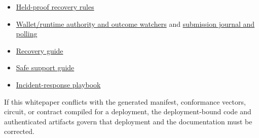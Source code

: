 \documentclass[11pt,letterpaper]{article}
\begin{document}
\begin{itemize}
{  review}, and
  \href{https://github.com/stellarchain/io.stellarkey/blob/v1.1.2/src/features/private-balance/runtime/fee-policy.ts}{fee
  policy}
\item
  \href{https://github.com/stellarchain/io.stellarkey/blob/v1.1.2/src/features/private-balance/runtime/spend-recovery.ts}{Held-proof
  recovery rules}
\item
  \href{https://github.com/stellarchain/io.stellarkey/blob/v1.1.2/src/features/private-balance/runtime/provider.tsx}{Wallet/\allowbreak{}runtime
  authority and outcome watchers} and
  \href{https://github.com/stellarchain/io.stellarkey/blob/v1.1.2/src/features/private-balance/runtime/submission.ts}{submission
  journal and polling}
\item
  \href{https://github.com/stellarchain/io.stellarkey/blob/v1.1.2/docs/private-balance-recovery.md}{Recovery
  guide}
\item
  \href{https://github.com/stellarchain/io.stellarkey/blob/v1.1.2/docs/private-balance-support.md}{Safe
  support guide}
\item
  \href{https://github.com/stellarchain/io.stellarkey/blob/v1.1.2/docs/private-balance-incident-response.md}{Incident-response
  playbook}
\end{itemize}

If this whitepaper conflicts with the generated manifest, conformance
vectors, circuit, or contract compiled for a deployment, the
deployment-bound code and authenticated artifacts govern that deployment
and the documentation must be corrected.
\end{document}
